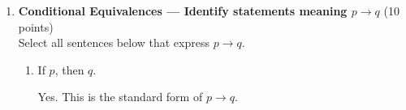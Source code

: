 \begin{enumerate}






  \newpage

  \item \textbf{Conditional Equivalences --- Identify statements meaning $p \rightarrow q$} (10 points)\\
  Select all sentences below that express $p \rightarrow q$.
  \begin{enumerate}[label=\Alph*.]
    \item If $p$, then $q$.\\
    \begin{subanswer}
      Yes. This is the standard form of $p \rightarrow q$. 
    \end{subanswer}


\end{enumerate}
\end{enumerate}
